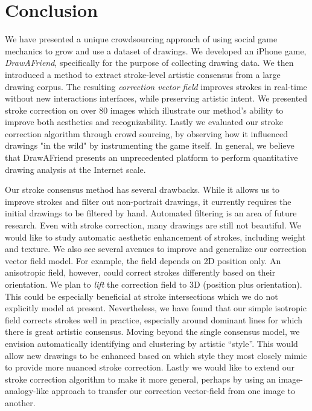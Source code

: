 \section{Conclusion}

We have presented a unique crowdsourcing approach of using social game mechanics to grow and use a dataset of drawings. We developed an iPhone game, \emph{DrawAFriend}, specifically for the purpose of
collecting drawing data. We then introduced a method to extract
stroke-level artistic consensus from a large drawing corpus. The
resulting \emph{correction vector field} improves strokes in
real-time without new interactions interfaces, while preserving artistic
intent. We presented stroke correction on over 80 images which illustrate our method's ability to improve both
aesthetics and recognizability. Lastly we evaluated our stroke correction algorithm through crowd sourcing, by observing how it influenced drawings "in the wild" by instrumenting the game itself. In general, we believe that DrawAFriend presents an unprecedented platform to perform quantitative drawing analysis at the Internet scale.

Our stroke consensus method has several drawbacks. While it allows us to improve strokes and filter out non-portrait drawings, it currently requires the initial drawings to be filtered by hand. Automated filtering is an area of future research. Even with stroke
correction, many drawings are still not beautiful. We would like to
study automatic aesthetic enhancement of strokes, including weight
and texture. We also see several avenues to improve and generalize
our correction vector field model. For example, the field depends on
2D position only. An anisotropic field, however, could correct strokes
differently based on their orientation. We plan to {\em lift} the correction field to
3D (position plus orientation). This could be especially
beneficial at stroke intersections which we do not explicitly model
at present. Nevertheless, we have found that our simple isotropic
field corrects strokes well in practice, especially
around dominant lines for which there is great artistic consensus.
Moving beyond the single consensus model, we envision automatically
identifying and clustering by artistic ``style''. This would allow new drawings to
be enhanced based on which style they most closely mimic to provide more
nuanced stroke correction. Lastly we would like to extend our stroke correction algorithm to make it more general, perhaps by using an image-analogy-like approach to transfer our correction vector-field from one image to another.

